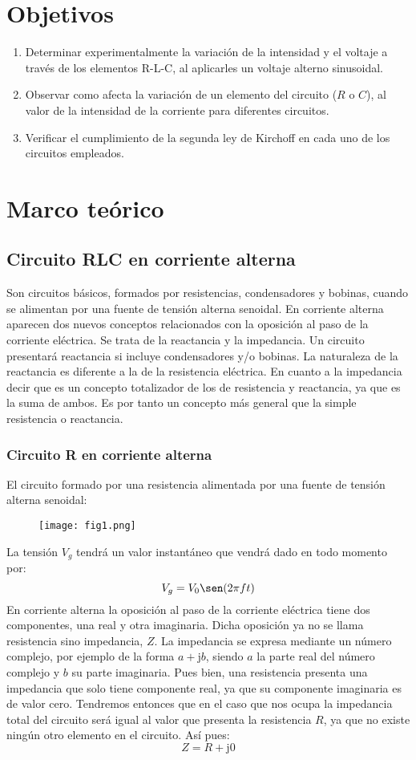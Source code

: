 \documentclass[a4paper,12pt]{report}
\begin{document}
\chapter{Objetivos}
\begin{enumerate}
\item Determinar experimentalmente la variación de la intensidad y el voltaje a través de los elementos R-L-C, al aplicarles un voltaje alterno sinusoidal.
\item Observar como afecta la variación de un elemento del circuito ($R$ o $C$), al valor de la intensidad de la corriente para diferentes circuitos.
\item Verificar el cumplimiento de la segunda ley de Kirchoff en cada uno de los circuitos empleados.
\end{enumerate}
\chapter{Marco teórico}
\section{Circuito RLC en corriente alterna}
Son circuitos básicos, formados por resistencias, condensadores y bobinas, cuando se alimentan por una fuente de tensión alterna senoidal. En corriente alterna aparecen dos nuevos conceptos relacionados con la oposición al paso de la corriente eléctrica. Se trata de la reactancia y la impedancia. Un circuito presentará reactancia si incluye condensadores y/o bobinas. La naturaleza de la reactancia es diferente a la de la resistencia eléctrica. En cuanto a la impedancia decir que es un concepto totalizador de los de resistencia y reactancia, ya que es la suma de ambos. Es por tanto un concepto más general que la simple resistencia o reactancia.
\subsection{Circuito R en corriente alterna}
El circuito formado por una resistencia alimentada por una fuente de tensión alterna senoidal:
\begin{figure}[H]
\centering
\texttt{[image: fig1.png]}
\end{figure}
La tensión $V_{g}$ tendrá un valor instantáneo que vendrá dado en todo momento por:
$$
V_{g} = V_{0}\sen(2\pi f t)
$$
En corriente alterna la oposición al paso de la corriente eléctrica tiene dos componentes, una real y otra imaginaria. Dicha oposición ya no se llama resistencia sino impedancia, $Z$. La impedancia se expresa mediante un número complejo, por ejemplo de la forma $a+\mathrm{j}b$, siendo $a$ la parte real del número complejo y $b$ su parte imaginaria. Pues bien, una resistencia presenta una impedancia que solo tiene componente real, ya que su componente imaginaria es de valor cero. Tendremos entonces que en el caso que nos ocupa la impedancia total del circuito será igual al valor que presenta la resistencia $R$, ya que no existe ningún otro elemento en el circuito. Así pues:
$$
Z = R + \mathrm{j}0
$$
\end{document}
